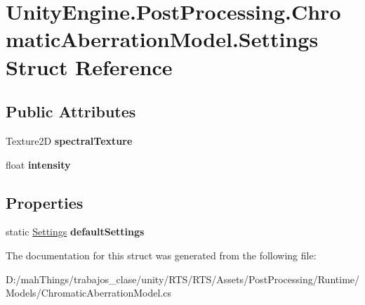 \hypertarget{struct_unity_engine_1_1_post_processing_1_1_chromatic_aberration_model_1_1_settings}{}\section{Unity\+Engine.\+Post\+Processing.\+Chromatic\+Aberration\+Model.\+Settings Struct Reference}
\label{struct_unity_engine_1_1_post_processing_1_1_chromatic_aberration_model_1_1_settings}
\subsection*{Public Attributes}
\begin{DoxyCompactItemize}
\item 
\mbox{\label{struct_unity_engine_1_1_post_processing_1_1_chromatic_aberration_model_1_1_settings_aff651d22c776d0cb82929551f0b33005}} 
Texture2D {\bfseries spectral\+Texture}
\item 
\mbox{\label{struct_unity_engine_1_1_post_processing_1_1_chromatic_aberration_model_1_1_settings_ac7c815ce4c835bb54ff58e507af198bc}} 
float {\bfseries intensity}
\end{DoxyCompactItemize}
\subsection*{Properties}
\begin{DoxyCompactItemize}
\item 
\mbox{\label{struct_unity_engine_1_1_post_processing_1_1_chromatic_aberration_model_1_1_settings_aed16f622438648f1fa48c1fddb602013}} 
static \mbox{\hyperlink{struct_unity_engine_1_1_post_processing_1_1_chromatic_aberration_model_1_1_settings}{Settings}} {\bfseries default\+Settings}
\end{DoxyCompactItemize}


The documentation for this struct was generated from the following file\+:\begin{DoxyCompactItemize}
\item 
D\+:/mah\+Things/trabajos\+\_\+clase/unity/\+R\+T\+S/\+R\+T\+S/\+Assets/\+Post\+Processing/\+Runtime/\+Models/Chromatic\+Aberration\+Model.\+cs\end{DoxyCompactItemize}
